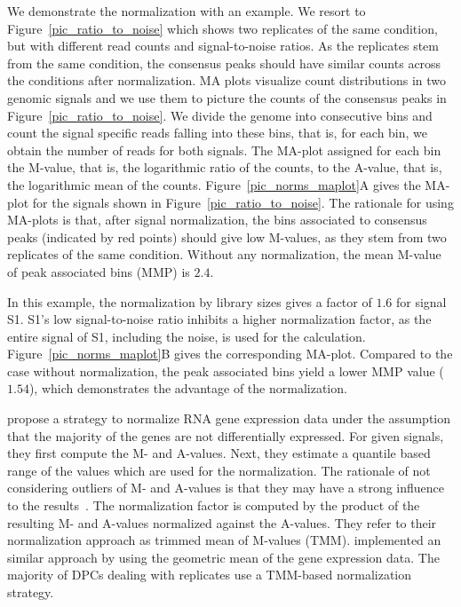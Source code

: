 We demonstrate the normalization with an example.
We resort to Figure~\ref{pic_ratio_to_noise} which shows two replicates of the same condition, but with different read counts and signal-to-noise ratios.
As the replicates stem from the same condition, the consensus peaks should have similar counts across the conditions after normalization.
MA plots visualize count distributions in two genomic signals and we use them to picture the counts of the consensus peaks in Figure~\ref{pic_ratio_to_noise}.
We divide the genome into consecutive bins and count the signal specific reads falling into these bins, that is, for each bin, we obtain the number of reads for both signals.
The MA-plot assigned for each bin the M-value, that is, the logarithmic ratio of the counts, to the A-value, that is, the logarithmic mean of the counts.
Figure~\ref{pic_norms_maplot}A gives the MA-plot for the signals shown in Figure~\ref{pic_ratio_to_noise}.
The rationale for using MA-plots is that, after signal normalization, the bins associated to consensus peaks (indicated by red points) should give low M-values, as they stem from two replicates of the same condition.
Without any normalization, the mean M-value of peak associated bins (MMP) is $2.4$.

In this example, the normalization by library sizes gives a factor of $1.6$ for signal S1.
S1's low signal-to-noise ratio inhibits a higher normalization factor, as the entire signal of S1, including the noise, is used for the calculation.
Figure~\ref{pic_norms_maplot}B gives the corresponding MA-plot.
Compared to the case without normalization, the peak associated bins yield a lower MMP value ($1.54$), which demonstrates the advantage of the normalization.

\cite{Robinson2010norm} propose a strategy to normalize RNA gene expression data under the assumption that the majority of the genes are not differentially expressed. 
For given signals, they first compute the M- and A-values.
Next, they estimate a quantile based range of the values which are used for the normalization.
The rationale of not considering outliers of M- and A-values is that they may have a strong influence to the results~\citep{Meyer2014}. 
The normalization factor is computed by the product of the resulting M- and A-values normalized against the A-values.
They refer to their normalization approach as trimmed mean of M-values (TMM).
\cite{anders2010} implemented an similar approach by using the geometric mean of the gene expression data.
The majority of DPCs dealing with replicates use a TMM-based normalization strategy. 

